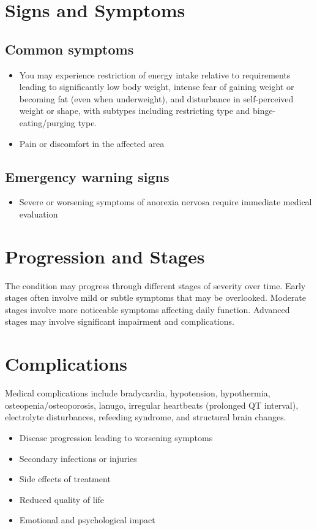 \section{Signs and Symptoms}
\subsection{Common symptoms}
\begin{itemize}[noitemsep]
  \item You may experience restriction of energy intake relative to requirements leading to significantly low body weight, intense fear of gaining weight or becoming fat (even when underweight), and disturbance in self-perceived weight or shape, with subtypes including restricting type and binge-eating/purging type.
  \item Pain or discomfort in the affected area
  \end{itemize}
\subsection{Emergency warning signs}
\begin{itemize}[noitemsep]
  \item Severe or worsening symptoms of anorexia nervosa require immediate medical evaluation
\end{itemize}
\section{Progression and Stages}
The condition may progress through different stages of severity over time. Early stages often involve mild or subtle symptoms that may be overlooked. Moderate stages involve more noticeable symptoms affecting daily function. Advanced stages may involve significant impairment and complications.
\section{Complications}
Medical complications include bradycardia, hypotension, hypothermia, osteopenia/osteoporosis, lanugo, irregular heartbeats (prolonged QT interval), electrolyte disturbances, refeeding syndrome, and structural brain changes.

\begin{itemize}[noitemsep]
  \item Disease progression leading to worsening symptoms
  \item Secondary infections or injuries
  \item Side effects of treatment
  \item Reduced quality of life
  \item Emotional and psychological impact
\end{itemize}
